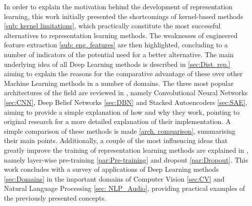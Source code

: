 \documentclass[a4paper]{article}
\begin{document}
	In order to explain the motivation behind the development of representation learning, this work initially presented the shortcomings of kernel-based methods \ref{sub: kernel limitations}, which practically constitute the most successful alternatives to representation learning methods. The weaknesses of engineered feature extraction \ref{sub: eng. features} are then highlighted, concluding to a number of indicators of the potential need for a better alternative. The main underlying idea of all Deep Learning methods is described in \autoref{sec:Dist. rep.} aiming to explain the reasons for the comparative advantage of these over other Machine Learning methods in a number of domains. The three most popular architectures of the field are reviewed in , namely Convolutional Neural Networks \ref{sec:CNN}, Deep Belief Networks \ref{sec:DBN} and Stacked Autoencoders \ref{sec:SAE}, aiming to provide a simple explanation of how and why they work, pointing to original research for a more detailed explanation of their implementation. A simple comparison of these methods is made \ref{arch. comparison}, summarising their main points. Additionally, a couple of the most influencing ideas that greatly improve the training of representation learning methods are explained in , namely layer-wise pre-training \ref{par:Pre-training} and dropout \ref{par:Dropout}. This work concludes with a survey of applications of Deep Learning methods \ref{sec:Domains} in the important domains of Computer Vision \ref{sec:CV} and Natural Language Processing \ref{sec: NLP_Audio}, providing practical examples of the previously presented concepts.
	
	
	
\end{document}
